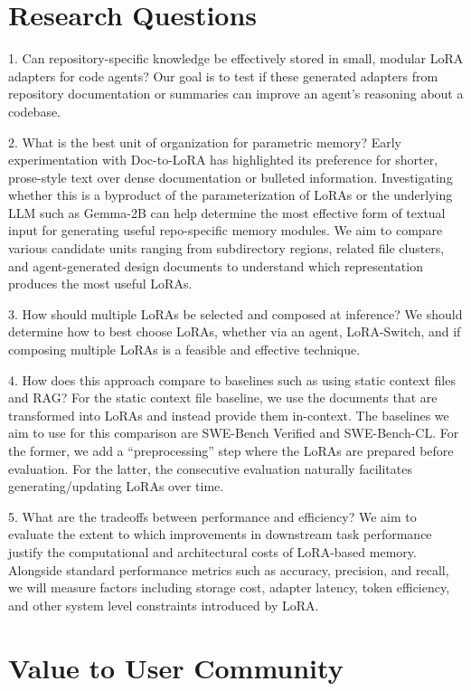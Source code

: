 \documentclass{article}
\begin{document}
\section{Research Questions}
1. Can repository-specific knowledge be effectively stored in small, modular LoRA adapters for code agents? Our goal is to test if these generated adapters from repository documentation or summaries can improve an agent's reasoning about a codebase.

2. What is the best unit of organization for parametric memory? Early experimentation with Doc-to-LoRA has highlighted its preference for shorter, prose-style text over dense documentation or bulleted information. Investigating whether this is a byproduct of the parameterization of LoRAs or the underlying LLM such as Gemma-2B can help determine the most effective form of textual input for generating useful repo-specific memory modules. We aim to compare various candidate units ranging from subdirectory regions, related file clusters, and agent-generated design documents to understand which representation produces the most useful LoRAs.

3. How should multiple LoRAs be selected and composed at inference?
We should determine how to best choose LoRAs, whether via an agent, LoRA-Switch, and if composing multiple LoRAs is a feasible and effective technique.

4. How does this approach compare to baselines such as using static context files and RAG? For the static context file baseline, we use the documents that are transformed into LoRAs and instead provide them in-context.
The baselines we aim to use for this comparison are SWE-Bench Verified and SWE-Bench-CL. 
For the former, we add a ``preprocessing'' step where the LoRAs are prepared before evaluation. For the latter, the consecutive evaluation naturally facilitates generating/updating LoRAs over time.

5. What are the tradeoffs between performance and efficiency?
We aim to evaluate the extent to which improvements in downstream task performance justify the computational and architectural costs of LoRA-based memory. Alongside standard performance metrics such as accuracy, precision, and recall, we will measure factors including storage cost, adapter latency, token efficiency, and other system level constraints introduced by LoRA. 

\section{Value to User Community}
\end{document}
